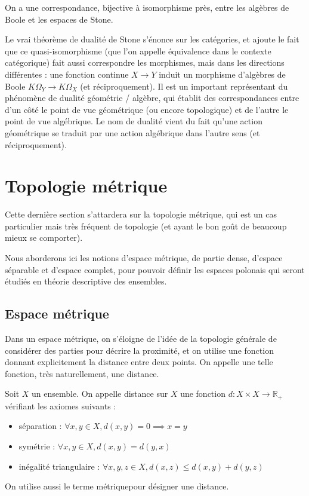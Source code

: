 \begin{theorem}
  On a une correspondance, bijective à isomorphisme près, entre les algèbres
  de Boole et les espaces de Stone.
\end{theorem}

Le vrai théorème de dualité de Stone s'énonce sur les catégories, et ajoute le
fait que ce quasi-isomorphisme (que l'on appelle équivalence dans le contexte
catégorique) fait aussi correspondre les morphismes, mais dans les directions
différentes : une fonction continue $X \to Y$ induit un morphisme d'algèbres de
Boole $K\Omega_Y\to K\Omega_X$ (et réciproquement). Il est un important
représentant du phénomène de dualité géométrie / algèbre, qui établit des
correspondances entre d'un côté le point de vue géométrique (ou encore
topologique) et de l'autre le point de vue algébrique. Le nom de dualité vient
du fait qu'une action géométrique se traduit par une action algébrique dans
l'autre sens (et réciproquement).

\section{Topologie métrique}

Cette dernière section s'attardera sur la topologie métrique, qui est un cas
particulier mais très fréquent de topologie (et ayant le bon goût de beaucoup
mieux se comporter).

Nous aborderons ici les notions d'espace métrique, de partie dense, d'espace
séparable et d'espace complet, pour pouvoir définir les espaces polonais qui
seront étudiés en théorie descriptive des ensembles.

\subsection{Espace métrique}

Dans un espace métrique, on s'éloigne de l'idée de la topologie générale de
considérer des parties pour décrire la proximité, et on utilise une fonction
donnant explicitement la distance entre deux points. On appelle une telle
fonction, très naturellement, une distance.

\begin{definition}[Distance]
  Soit $X$ un ensemble. On appelle distance sur $X$ une fonction
  $d : X \times X \to \mathbb R_+$ vérifiant les axiomes suivants :
  \begin{itemize}
  \item séparation : $\forall x,y\in X, d(x,y) =0 \implies x = y$
  \item symétrie : $\forall x,y\in X, d(x,y)=d(y,x)$
  \item inégalité triangulaire :
    $\forall x,y,z\in X, d(x,z) \leq d(x,y)+d(y,z)$
  \end{itemize}

  On utilise aussi le terme \og métrique\fg pour désigner une distance.
\end{definition}

